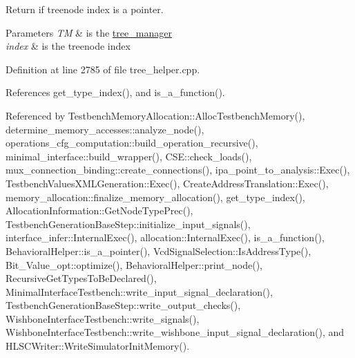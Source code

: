 Return if treenode index is a pointer. 


\begin{DoxyParams}{Parameters}
{\em TM} & is the \hyperlink{classtree__manager}{tree\+\_\+manager} \\
\hline
{\em index} & is the treenode index \\
\hline
\end{DoxyParams}


Definition at line 2785 of file tree\+\_\+helper.\+cpp.



References get\+\_\+type\+\_\+index(), and is\+\_\+a\+\_\+function().



Referenced by Testbench\+Memory\+Allocation\+::\+Alloc\+Testbench\+Memory(), determine\+\_\+memory\+\_\+accesses\+::analyze\+\_\+node(), operations\+\_\+cfg\+\_\+computation\+::build\+\_\+operation\+\_\+recursive(), minimal\+\_\+interface\+::build\+\_\+wrapper(), C\+S\+E\+::check\+\_\+loads(), mux\+\_\+connection\+\_\+binding\+::create\+\_\+connections(), ipa\+\_\+point\+\_\+to\+\_\+analysis\+::\+Exec(), Testbench\+Values\+X\+M\+L\+Generation\+::\+Exec(), Create\+Address\+Translation\+::\+Exec(), memory\+\_\+allocation\+::finalize\+\_\+memory\+\_\+allocation(), get\+\_\+type\+\_\+index(), Allocation\+Information\+::\+Get\+Node\+Type\+Prec(), Testbench\+Generation\+Base\+Step\+::initialize\+\_\+input\+\_\+signals(), interface\+\_\+infer\+::\+Internal\+Exec(), allocation\+::\+Internal\+Exec(), is\+\_\+a\+\_\+function(), Behavioral\+Helper\+::is\+\_\+a\+\_\+pointer(), Vcd\+Signal\+Selection\+::\+Is\+Address\+Type(), Bit\+\_\+\+Value\+\_\+opt\+::optimize(), Behavioral\+Helper\+::print\+\_\+node(), Recursive\+Get\+Types\+To\+Be\+Declared(), Minimal\+Interface\+Testbench\+::write\+\_\+input\+\_\+signal\+\_\+declaration(), Testbench\+Generation\+Base\+Step\+::write\+\_\+output\+\_\+checks(), Wishbone\+Interface\+Testbench\+::write\+\_\+signals(), Wishbone\+Interface\+Testbench\+::write\+\_\+wishbone\+\_\+input\+\_\+signal\+\_\+declaration(), and H\+L\+S\+C\+Writer\+::\+Write\+Simulator\+Init\+Memory().

